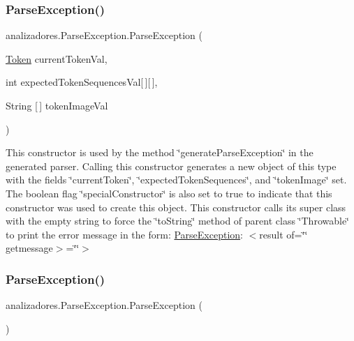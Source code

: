 \subsubsection{\texorpdfstring{Parse\+Exception()}{ParseException()}\hspace{0.1cm}{\footnotesize\ttfamily [1/3]}}
{\footnotesize\ttfamily analizadores.\+Parse\+Exception.\+Parse\+Exception (\begin{DoxyParamCaption}\item[{\mbox{\hyperlink{classanalizadores_1_1_token}{Token}}}]{current\+Token\+Val,  }\item[{int}]{expected\+Token\+Sequences\+Val\mbox{[}$\,$\mbox{]}\mbox{[}$\,$\mbox{]},  }\item[{String \mbox{[}$\,$\mbox{]}}]{token\+Image\+Val }\end{DoxyParamCaption})}

This constructor is used by the method \char`\"{}generate\+Parse\+Exception\char`\"{} in the generated parser. Calling this constructor generates a new object of this type with the fields \char`\"{}current\+Token\char`\"{}, \char`\"{}expected\+Token\+Sequences\char`\"{}, and \char`\"{}token\+Image\char`\"{} set. The boolean flag \char`\"{}special\+Constructor\char`\"{} is also set to true to indicate that this constructor was used to create this object. This constructor calls its super class with the empty string to force the \char`\"{}to\+String\char`\"{} method of parent class \char`\"{}\+Throwable\char`\"{} to print the error message in the form\+: \mbox{\hyperlink{classanalizadores_1_1_parse_exception}{Parse\+Exception}}\+: $<$result of=\char`\"{}\char`\"{} getmessage$>$=\char`\"{}\char`\"{}$>$ \mbox{\label{classanalizadores_1_1_parse_exception_ad2caa939d34e9a1a6f550e795468bac9}} 
\subsubsection{\texorpdfstring{Parse\+Exception()}{ParseException()}\hspace{0.1cm}{\footnotesize\ttfamily [2/3]}}
{\footnotesize\ttfamily analizadores.\+Parse\+Exception.\+Parse\+Exception (\begin{DoxyParamCaption}{ }\end{DoxyParamCaption})}

